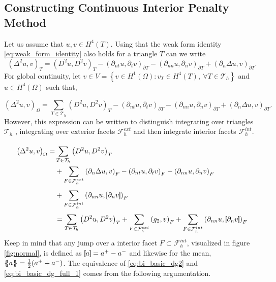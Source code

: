 \subsection{Constructing Continuous Interior Penalty Method}%
\label{sub:constructing_continious_interior_penalty_method}

 Let us assume that $u,v \in
H^{4}\left( T  \right) $. Using that the weak form identity \eqref{eq:weak_form_identity} also holds for a triangle $T$ can we write
\begin{equation}
\label{eq:bi_basic_dg}
\left( \Delta  ^{2} u,v \right) _{T} =  \left( D^2u,D^2v \right) _{T } - \left(\partial _{nt} u, \partial _{t}v
\right)_{\partial T} - \left(\partial _{nn} u, \partial _{n}v \right)_{\partial T} + \left(\partial _{n} \Delta  u,v
\right)_{\partial T}
.\end{equation}
For global continuity, let  $v \in V =  \left\{ v \in H^{1}\left( \Omega  \right): v_{T} \in  H^{4}\left( T \right), \ \forall T \in
\mathcal{T}_{h}    \right\} $ and $u \in  H^{4}\left( \Omega  \right) $ such that,

\begin{equation}
\label{eq:bi_basic_dg2}
\left( \Delta  ^{2} u,v \right) _{\Omega } = \sum_{T \in  \mathcal{T} _{h}}^{}  \left( D^2u,D^2v \right) _{T } - \left(\partial _{nt} u, \partial _{t}v
\right)_{\partial T} - \left(\partial _{nn} u, \partial _{n}v \right)_{\partial T} + \left(\partial _{n} \Delta  u,v
\right)_{\partial T}.
\end{equation}
However, this expression can be written to distinguish integrating over triangles $\mathcal{T} _{h}$ , integrating over exterior facets $\mathcal{F} _{h}^{ext}$ and then integrate interior facets $\mathcal{F} _{h}^{int}$.

\begin{equation}
\label{eq:bi_basic_dg_full_1}
\begin{split}
\left( \Delta  ^{2} u, v \right) _{\Omega } =& \sum_{T \in  \mathcal{T} _{h}}^{} \left( D^2u, D^2v \right)_{T}    \\
& + \sum_{F \in \mathcal{F}_{h}^{ext}}  \left(\partial _{n} \Delta u, v  \right) _{F} - \left(\partial _{nt} u, \partial _{t} v \right) _{F}-
\left( \partial _{nn} u, \partial _{n} v \right)_{F}  \\
& + \sum_{F \in \mathcal{F}_{h}  ^{int}}^{} \left(\partial _{nn} u , \jump{ \partial _{n} v }
\right)_{F} \\
& = \sum_{T \in  \mathcal{T} _{h}}^{} \left( D^2u, D^2v \right)_{T} + \sum_{F \in
\mathcal{F} ^{ext}_{h}}^{} \left(g_{2}, v  \right) _{F}
  + \sum_{F \in \mathcal{F}_{h}  ^{int}}^{} \left( \partial _{nn} u , \jump{ \partial_{n} v } \right)_{F}
\end{split}
\end{equation}
Keep in mind that any jump over a interior facet $F \subset \mathcal{F} _{h}^{int}   $, visualized in figure \ref{fig:normal}, is defined as $\left[\!\!\left[  a  \right]\!\!\right] =    a^{+} - a^{-} $
and likewise for the mean, $\left\{\!\!\left\{ a  \right\}\!\!\right\} = \frac{1}{2}(   a^{+}
+ a^{-})$.    The equivalence of \eqref{eq:bi_basic_dg2} and \eqref{eq:bi_basic_dg_full_1} comes from the following argumentation.

